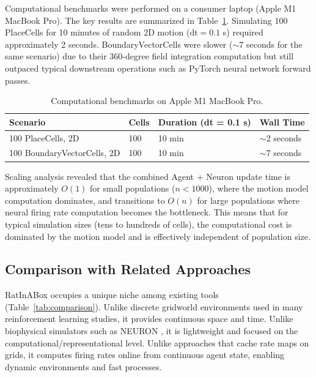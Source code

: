 \documentclass[12pt]{article}
\begin{document}
Computational benchmarks were performed on a consumer laptop (Apple M1 MacBook Pro). The key results are summarized in Table~\ref{tab:benchmarks}. Simulating 100 PlaceCells for 10 minutes of random 2D motion ($\text{dt} = 0.1$ s) required approximately 2 seconds. BoundaryVectorCells were slower ($\sim$7 seconds for the same scenario) due to their 360-degree field integration computation but still outpaced typical downstream operations such as PyTorch neural network forward passes.

\begin{table}[htbp]
\centering
\caption{Computational benchmarks on Apple M1 MacBook Pro.}
\label{tab:benchmarks}
\begin{tabular}{llll}
\toprule
Scenario & Cells & Duration (dt = 0.1 s) & Wall Time \\
\midrule
100 PlaceCells, 2D & 100 & 10 min & $\sim$2 seconds \\
100 BoundaryVectorCells, 2D & 100 & 10 min & $\sim$7 seconds \\
\bottomrule
\end{tabular}
\end{table}

Scaling analysis revealed that the combined Agent + Neuron update time is approximately $O(1)$ for small populations ($n < 1000$), where the motion model computation dominates, and transitions to $O(n)$ for large populations where neural firing rate computation becomes the bottleneck. This means that for typical simulation sizes (tens to hundreds of cells), the computational cost is dominated by the motion model and is effectively independent of population size.

\subsection{Comparison with Related Approaches}

RatInABox occupies a unique niche among existing tools (Table~\ref{tab:comparison}). Unlike discrete gridworld environments used in many reinforcement learning studies, it provides continuous space and time. Unlike biophysical simulators such as NEURON \citep{hines1997neuron}, it is lightweight and focused on the computational/representational level. Unlike approaches that cache rate maps on grids, it computes firing rates online from continuous agent state, enabling dynamic environments and fast processes.
\end{document}
